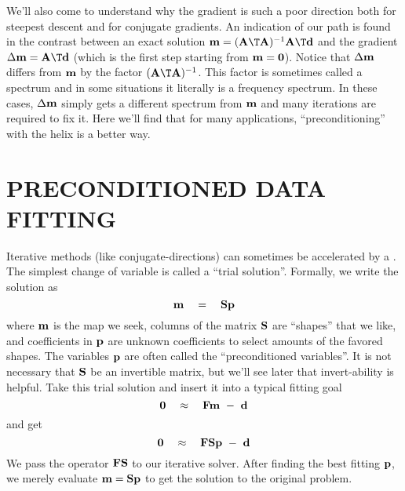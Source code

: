 \par
We'll also come to understand why the gradient is such a poor direction
both for steepest descent and for conjugate gradients.
An indication of our path is found in the contrast between
an exact solution
$\bold m = (\bold A\T\bold A)^{-1}\bold A\T\bold d$ and the
gradient
$\Delta \bold m = \bold A\T\bold d$
(which is the first step starting from $\bold m =\bold 0$).
Notice that $\Delta \bold m$ differs from $\bold m$
by the factor $(\bold A\T\bold A)^{-1}$.
This factor is sometimes called a spectrum
and in some situations it literally is a frequency spectrum.
In these cases, $\Delta \bold m$ simply gets a different
spectrum from $\bold m$ and many iterations are required to fix it.
Here we'll find that for many applications,
``preconditioning'' with the helix is a better way.



\section{PRECONDITIONED DATA FITTING}
\par
Iterative methods (like conjugate-directions) can sometimes be accelerated
by a .
The simplest change of variable is called a ``trial solution''.
Formally, we write the solution as
\begin{equation}
\bold m \quad =\quad \bold S \bold p
\end{equation}
where $\bold m$ is the map we seek,
columns of the matrix $\bold S$ are ``shapes'' that we like,
and coefficients in $\bold p$ are unknown coefficients
to select amounts of the favored shapes.
The variables $\bold p$  are often called the ``preconditioned variables''.
It is not necessary that $\bold S$ be an invertible matrix,
but we'll see later that invert-ability is helpful.
Take this trial solution and insert it into
a typical fitting goal
\begin{equation}
\bold 0 \quad\approx\quad  \bold F \bold m \ -\  \bold d
\end{equation}
and get
\begin{equation}
\bold 0 \quad\approx\quad  \bold F \bold S \bold p \ -\  \bold d
\end{equation}
We pass the operator $\bold F \bold S$ to our iterative solver.
After finding the best fitting                                      $\bold p$,
we merely evaluate
                                                $ \bold m = \bold S \bold p$
to get the solution to the original problem.

